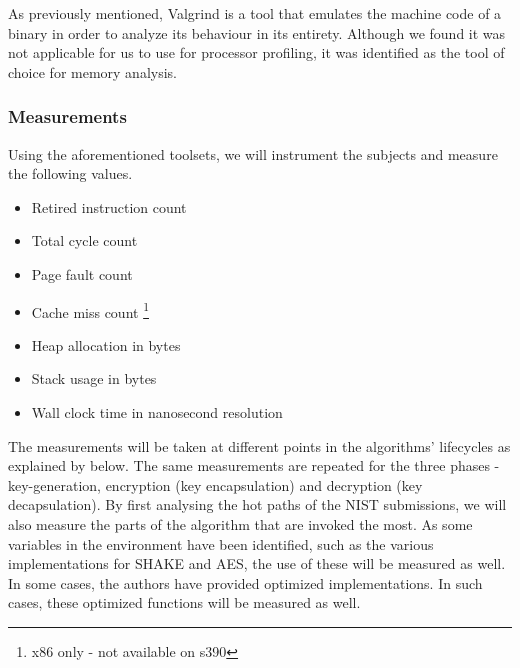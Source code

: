 As previously mentioned, Valgrind is a tool that emulates the machine code of a binary in order to analyze its behaviour in its entirety. Although we found it was not applicable for us to use for processor profiling, it was identified as the tool of choice for memory analysis.

\subsubsection{Measurements}

Using the aforementioned toolsets, we will instrument the subjects and measure the following values.

\begin{itemize}
    \item Retired instruction count
    \item Total cycle count
    \item Page fault count
    \item Cache miss count \footnote{x86 only - not available on s390}
    \item Heap allocation in bytes
    \item Stack usage in bytes
    \item Wall clock time in nanosecond resolution
\end{itemize}

The measurements will be taken at different points in the algorithms' lifecycles as explained by below. The same measurements are repeated for the three phases - key-generation, encryption (key encapsulation) and decryption (key decapsulation). By first analysing the hot paths of the NIST submissions, we will also measure the parts of the algorithm that are invoked the most. As some variables in the environment have been identified, such as the various implementations for SHAKE and AES, the use of these will be measured as well. In some cases, the authors have provided optimized implementations. In such cases, these optimized functions will be measured as well.

